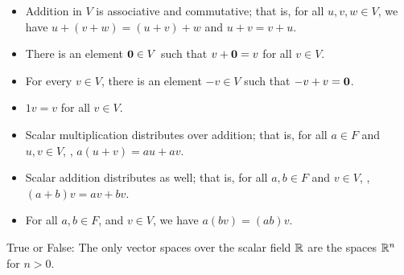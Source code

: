 \begin{itemize}
\item Addition in $V$ is associative and commutative; that is, for all $u,v,w \in V$, we have
$u+(v+w) = (u+v)+w$ and $u+v  = v+u$.  
\item There is an element $\mathbf{0} \in V$ such that $v+\mathbf{0} = v$ for all $v \in V$.
\item For every $v\in V$, there is an element $-v \in V$ such that $-v + v = \mathbf{0}$.  
\item $1v = v$ for all $v \in V$.  
\item Scalar multiplication distributes over addition; that is, for all $a \in F$ and $u,v \in V$, , $a(u+v) = au + av$.  
\item Scalar addition distributes as well; that is, for all $a,b \in F$ and $v \in V$, , $(a+b)v = av + bv$.  
\item For all $a,b \in F$, and $v\in V$, we have $a(bv) = (ab)v$.  
\end{itemize}





\endedxtext



True or False: The only vector spaces over the scalar field $\mathbb R$ are the spaces
$\mathbb R^n$ for $n> 0$.  



\endedxproblem


\endedxvertical

